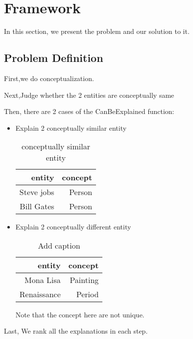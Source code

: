 \section{Framework}


In this section, we present the problem and our solution to it.

\subsection{Problem Definition}


First,we do conceptualization.

Next,Judge whether the 2 entities are conceptually same

Then, there are 2 cases of the CanBeExplained function:

\begin{itemize}
\item Explain 2 conceptually similar entity

\begin{table}[htbp]
  \centering
  \caption{conceptually similar entity}
    \begin{tabular}{rr}
    \toprule
    entity & concept \\
    \midrule
    Steve jobs & Person \\
    Bill Gates & Person \\
    \bottomrule
    \end{tabular}%
  \label{tab:addlabel}%
\end{table}%


\item Explain 2 conceptually different entity
\begin{table}[htbp]
  \centering
  \caption{Add caption}
    \begin{tabular}{rr}
    \toprule
    entity & concept \\
    \midrule
    Mona Lisa & Painting \\
    Renaissance & Period \\
    \bottomrule
    \end{tabular}%
  \label{tab:addlabel}%
\end{table}%

Note that the concept here are not unique.

\end{itemize}


Last, We rank all the explanations in each step.



